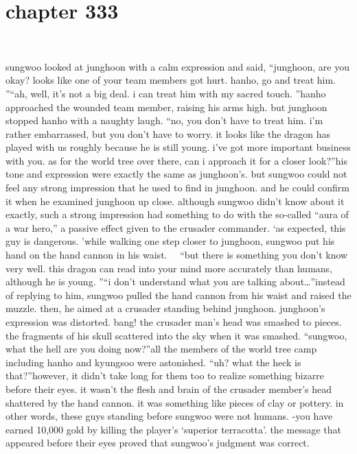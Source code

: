 \section{chapter 333}

                             




sungwoo looked at junghoon with a calm expression and said, “junghoon, are you okay? looks like one of your team members got hurt.
 hanho, go and treat him.
”“ah, well, it’s not a big deal.
 i can treat him with my sacred touch.
”hanho approached the wounded team member, raising his arms high.
but junghoon stopped hanho with a naughty laugh.
“no, you don’t have to treat him.
 i’m rather embarrassed, but you don’t have to worry.
 it looks like the dragon has played with us roughly because he is still young.
 i’ve got more important business with you.
 as for the world tree over there, can i approach it for a closer look?”his tone and expression were exactly the same as junghoon’s.
 but sungwoo could not feel any strong impression that he used to find in junghoon.
 and he could confirm it when he examined junghoon up close.
although sungwoo didn’t know about it exactly, such a strong impression had something to do with the so-called “aura of a war hero,” a passive effect given to the crusader commander.
‘as expected, this guy is dangerous.
’while walking one step closer to junghoon, sungwoo put his hand on the hand cannon in his waist.
  “but there is something you don’t know very well.
 this dragon can read into your mind more accurately than humans, although he is young.
”“i don’t understand what you are talking about…”instead of replying to him, sungwoo pulled the hand cannon from his waist and raised the muzzle.
 then, he aimed at a crusader standing behind junghoon.
junghoon’s expression was distorted.
bang!
the crusader man’s head was smashed to pieces.
 the fragments of his skull scattered into the sky when it was smashed.
“sungwoo, what the hell are you doing now?”all the members of the world tree camp including hanho and kyungsoo were astonished.
“uh? what the heck is that?”however, it didn’t take long for them too to realize something bizarre before their eyes.
it wasn’t the flesh and brain of the crusader member’s head shattered by the hand cannon.
 it was something like pieces of clay or pottery.
 in other words, these guys standing before sungwoo were not humans.
-you have earned 10,000 gold by killing the player’s ‘superior terracotta’.
the message that appeared before their eyes proved that sungwoo’s judgment was correct.
